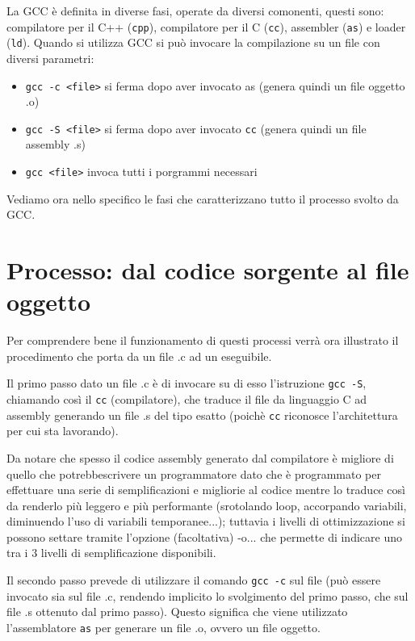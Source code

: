 \documentclass[class=book, crop=false, oneside]{standalone}
\begin{document}
La GCC è definita in diverse fasi, operate da diversi comonenti, questi sono: compilatore per il C++ (\texttt{cpp}), compilatore per il C (\texttt{cc}), assembler (\texttt{as}) e loader (\texttt{ld}).
Quando si utilizza GCC si può invocare la compilazione su un file con diversi parametri:
\begin{itemize}
	\item \texttt{gcc -c <file>} si ferma dopo aver invocato as (genera quindi un file oggetto .o)
	\item \texttt{gcc -S <file>} si ferma dopo aver invocato \texttt{cc} (genera quindi un file assembly .s)
	\item \texttt{gcc <file>} invoca tutti i porgrammi necessari
\end{itemize}
Vediamo ora nello specifico le fasi che caratterizzano tutto il processo svolto da GCC.

\section{Processo: dal codice sorgente al file oggetto}

Per comprendere bene il funzionamento di questi processi verrà ora illustrato il procedimento che porta da un file .c ad un eseguibile.

Il primo passo dato un file .c è di invocare su di esso l'istruzione \texttt{gcc -S}, chiamando così il \texttt{cc} (compilatore), che traduce il file da linguaggio C ad assembly generando un file .s del tipo esatto (poichè \texttt{cc} riconosce l'architettura per cui sta lavorando).

Da notare che spesso il codice assembly generato dal compilatore è migliore di quello che potrebbescrivere un programmatore dato che è programmato per effettuare una serie di semplificazioni e migliorie al codice mentre lo traduce così da renderlo più leggero e più performante (srotolando loop, accorpando variabili, diminuendo l'uso di variabili temporanee...); tuttavia i livelli di ottimizzazione si possono settare tramite l'opzione (facoltativa) -o... che permette di indicare uno tra i 3 livelli di semplificazione disponibili.

Il secondo passo prevede di utilizzare il comando \texttt{gcc -c} sul file (può essere invocato sia sul file .c, rendendo implicito lo svolgimento del primo passo, che sul file .s ottenuto dal primo passo). Questo significa che viene utilizzato l'assemblatore \texttt{as} per generare un file .o, ovvero un file oggetto.
\end{document}
